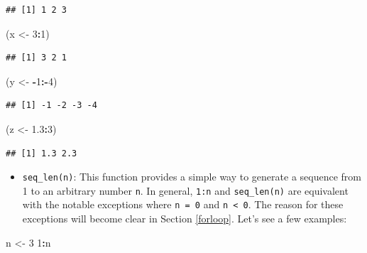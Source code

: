 \documentclass[12pt,]{krantz}
\newenvironment{Shaded}{\begin{snugshade}}{\end{snugshade}}
\newcommand{\DecValTok}[1]{\textcolor[rgb]{0.06,0.06,0.06}{#1}}
\newcommand{\FloatTok}[1]{\textcolor[rgb]{0.06,0.06,0.06}{#1}}
\newcommand{\StringTok}[1]{\textcolor[rgb]{0.5,0.5,0.5}{#1}}
\newcommand{\OperatorTok}[1]{\textcolor[rgb]{0.43,0.43,0.43}{\textbf{#1}}}
\newcommand{\NormalTok}[1]{#1}
\providecommand{\tightlist}{%
  \setlength{\itemsep}{0pt}\setlength{\parskip}{0pt}}
\begin{document}
\begin{verbatim}
## [1] 1 2 3
\end{verbatim}

\begin{Shaded}
\begin{Highlighting}[]
\NormalTok{(x <-}\StringTok{ }\DecValTok{3}\OperatorTok{:}\DecValTok{1}\NormalTok{)}
\end{Highlighting}
\end{Shaded}

\begin{verbatim}
## [1] 3 2 1
\end{verbatim}

\begin{Shaded}
\begin{Highlighting}[]
\NormalTok{(y <-}\StringTok{ }\OperatorTok{-}\DecValTok{1}\OperatorTok{:-}\DecValTok{4}\NormalTok{)}
\end{Highlighting}
\end{Shaded}

\begin{verbatim}
## [1] -1 -2 -3 -4
\end{verbatim}

\begin{Shaded}
\begin{Highlighting}[]
\NormalTok{(z <-}\StringTok{ }\FloatTok{1.3}\OperatorTok{:}\DecValTok{3}\NormalTok{)}
\end{Highlighting}
\end{Shaded}

\begin{verbatim}
## [1] 1.3 2.3
\end{verbatim}

\begin{itemize}
\tightlist
\item
  \texttt{seq\_len(n)}: This function provides a simple way to generate
  a sequence from 1 to an arbitrary number \texttt{n}. In general,
  \texttt{1:n} and \texttt{seq\_len(n)} are equivalent with the notable
  exceptions where \texttt{n\ =\ 0} and \texttt{n\ \textless{}\ 0}. The
  reason for these exceptions will become clear in Section
  \ref{forloop}. Let's see a few examples:
\end{itemize}

\begin{Shaded}
\begin{Highlighting}[]
\NormalTok{n <-}\StringTok{ }\DecValTok{3}
\DecValTok{1}\OperatorTok{:}\NormalTok{n}
\end{Highlighting}
\end{Shaded}
\end{document}
